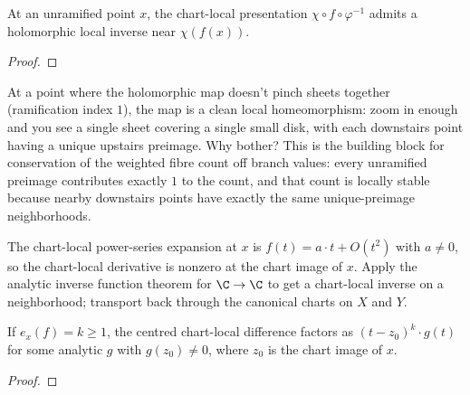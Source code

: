 \begin{lemma}
\label{lem:chart-local-inverse-unramified}
At an unramified point \(x\), the chart-local presentation
\(\chi\circ f\circ\varphi^{-1}\) admits a holomorphic local inverse
near \(\chi(f(x))\).
\leanok
\end{lemma}
\begin{proof}\leanok\end{proof}

\begin{layman}
At a point where the holomorphic map doesn't pinch sheets together
(ramification index \(1\)), the map is a clean local
homeomorphism: zoom in enough and you see a single sheet covering a
single small disk, with each downstairs point having a unique upstairs
preimage. Why bother? This is the building block for conservation of
the weighted fibre count off branch values: every unramified preimage
contributes exactly \(1\) to the count, and that count is locally
stable because nearby downstairs points have exactly the same
unique-preimage neighborhoods.
\end{layman}

\begin{proofsketch}
The chart-local power-series expansion at \(x\) is
\(f(t)=a\cdot t+O(t^2)\) with \(a\ne 0\), so the chart-local derivative
is nonzero at the chart image of \(x\). Apply the analytic inverse
function theorem for \(\C\to\C\) to get a chart-local inverse on a
neighborhood; transport back through the canonical charts on \(X\)
and \(Y\).
\end{proofsketch}

\begin{lemma}
\label{lem:chart-local-pow-mul}
If \(e_x(f)=k\ge 1\), the centred chart-local difference factors as
\((t-z_0)^k\cdot g(t)\) for some analytic \(g\) with \(g(z_0)\ne 0\),
where \(z_0\) is the chart image of \(x\).
\leanok
\end{lemma}
\begin{proof}\leanok\end{proof}

